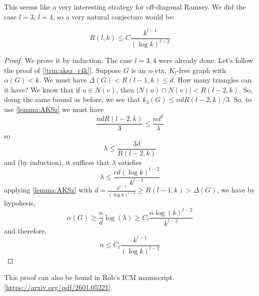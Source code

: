 This seems like a very interesting strategy for off-diagonal Ramsey.
We did the case $l = 3$,
$l=4$, so a very natural conjecture would be:
\begin{theorem}
	\[
		R(l,k) \leq C\frac{k^{l-1}}{(\log k)^{l-2}}
	\]
\end{theorem}
\begin{proof}
	We prove it by induction. The case $l = 3,4$ were already done.
	Let's follow the proof of [\ref{trm:aksz_r4k}].
	Suppose $G$ is an $n$-vtx, $K_l$-free graph with $\alpha(G) < k$.
	We must have $\Delta(G) < R(l-1,k) \leq d$. How
	many triangles can it have? We know that if $u \in N(v)$, then
	$|N(u)\cap N(v)| < R(l-2,k)$. So, doing the same bound as before,
	we see that $k_3(G) \leq ndR(l-2,k)/3$. So, to use \ref{lemma:AKSz}
	we must have
	\[
		\frac{ndR(l-2,k)}{3} \leq \frac{nd^2}{\lambda}
	\]
	so
	\[
		\lambda \leq \frac{3d}{R(l-2,k)}
	\]
	and (by induction), it suffices that $\lambda$ satisfies
	\[
		\lambda \leq \frac{c d(\log k)^{l-2}}{k^{l-1}}
	\]
	applying \ref{lemma:AKSz} with $d = \frac{k^{l-1}}{(\log k)^{l-2}}
	\geq R(l-1,k) > \Delta(G)$, we have by hypohesis,
	\[
		\alpha(G) \geq \frac{n}{d}\log(\lambda) \geq C_l
		\frac{n\log(k)^{l-2}}{k^{l-2}}
	\]
	and therefore,
	\[
		n \leq C_l\frac{k^{l-1}}{(\log k)^{l-2}}
	\]
\end{proof}

This proof can also be found in Rob's ICM manuscript.
[\url{https://arxiv.org/pdf/2601.05221}].

